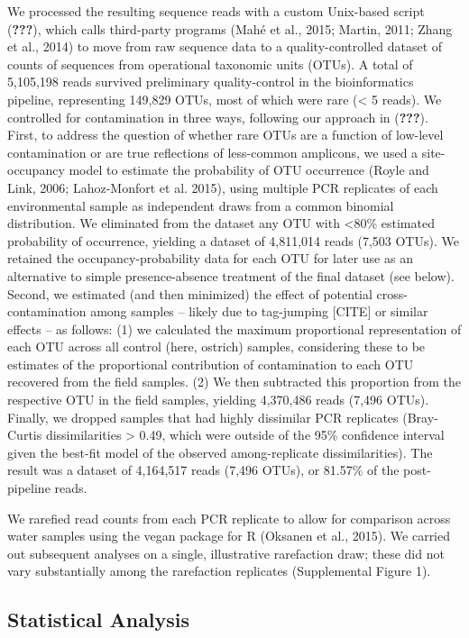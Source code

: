 \documentclass[fleqn,10pt,lineno]{wlpeerj} %
\begin{document}
We processed the resulting sequence reads with a custom Unix-based
script ({\textbf{???}}), which calls third-party programs (Mahé et al.,
2015; Martin, 2011; Zhang et al., 2014) to move from raw sequence data
to a quality-controlled dataset of counts of sequences from operational
taxonomic units (OTUs). A total of 5,105,198 reads survived preliminary
quality-control in the bioinformatics pipeline, representing 149,829
OTUs, most of which were rare (\textless{} 5 reads). We controlled for
contamination in three ways, following our approach in ({\textbf{???}}).
First, to address the question of whether rare OTUs are a function of
low-level contamination or are true reflections of less-common
amplicons, we used a site-occupancy model to estimate the probability of
OTU occurrence (Royle and Link, 2006; Lahoz-Monfort et al. 2015), using
multiple PCR replicates of each environmental sample as independent
draws from a common binomial distribution. We eliminated from the
dataset any OTU with \textless{}80\% estimated probability of
occurrence, yielding a dataset of 4,811,014 reads (7,503 OTUs). We
retained the occupancy-probability data for each OTU for later use as an
alternative to simple presence-absence treatment of the final dataset
(see below). Second, we estimated (and then minimized) the effect of
potential cross-contamination among samples -- likely due to tag-jumping
{[}CITE{]} or similar effects -- as follows: (1) we calculated the
maximum proportional representation of each OTU across all control
(here, ostrich) samples, considering these to be estimates of the
proportional contribution of contamination to each OTU recovered from
the field samples. (2) We then subtracted this proportion from the
respective OTU in the field samples, yielding 4,370,486 reads (7,496
OTUs). Finally, we dropped samples that had highly dissimilar PCR
replicates (Bray-Curtis dissimilarities \textgreater{} 0.49, which were
outside of the 95\% confidence interval given the best-fit model of the
observed among-replicate dissimilarities). The result was a dataset of
4,164,517 reads (7,496 OTUs), or 81.57\% of the post-pipeline reads.

We rarefied read counts from each PCR replicate to allow for comparison
across water samples using the vegan package for R (Oksanen et al.,
2015). We carried out subsequent analyses on a single, illustrative
rarefaction draw; these did not vary substantially among the rarefaction
replicates (Supplemental Figure 1).

\subsection{Statistical Analysis}\label{statistical-analysis}
\end{document}
